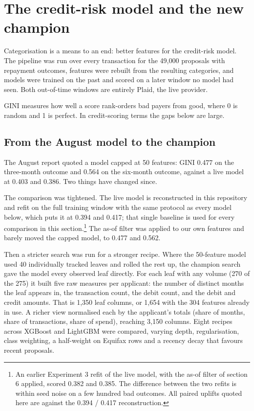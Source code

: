 \section{The credit-risk model and the new champion}
Categorisation is a means to an end: better features for the credit-risk model. The pipeline was run over every transaction for the 49,000 proposals with repayment outcomes, features were rebuilt from the resulting categories, and models were trained on the past and scored on a later window no model had seen. Both out-of-time windows are entirely Plaid, the live provider.

GINI measures how well a score rank-orders bad payers from good, where 0 is random and 1 is perfect. In credit-scoring terms the gaps below are large.

\subsection{From the August model to the champion}
The August report quoted a model capped at 50 features: GINI 0.477 on the three-month outcome and 0.564 on the six-month outcome, against a live model at 0.403 and 0.386. Two things have changed since.

The comparison was tightened. The live model is reconstructed in this repository and refit on the full training window with the same protocol as every model below, which puts it at 0.394 and 0.417; that single baseline is used for every comparison in this section.\footnote{An earlier Experiment 3 refit of the live model, with the as-of filter of section 6 applied, scored 0.382 and 0.385. The difference between the two refits is within seed noise on a few hundred bad outcomes. All paired uplifts quoted here are against the 0.394 / 0.417 reconstruction.} The as-of filter was applied to our own features and barely moved the capped model, to 0.477 and 0.562.

Then a stricter search was run for a stronger recipe. Where the 50-feature model used 40 individually tracked leaves and rolled the rest up, the champion search gave the model every observed leaf directly. For each leaf with any volume (270 of the 275) it built five raw measures per applicant: the number of distinct months the leaf appears in, the transaction count, the debit count, and the debit and credit amounts. That is 1,350 leaf columns, or 1,654 with the 304 features already in use. A richer view normalised each by the applicant's totals (share of months, share of transactions, share of spend), reaching 3,150 columns. Eight recipes across XGBoost and LightGBM were compared, varying depth, regularisation, class weighting, a half-weight on Equifax rows and a recency decay that favours recent proposals.

